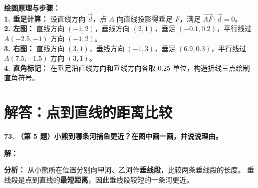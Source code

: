 \documentclass[12pt, a4paper]{ctexrep}
\begin{document}
\vspace{0.4cm}
{\small\color{blue!70!black}
\textbf{绘图原理与步骤：}\\
\textbf{1. 垂足计算：} 设直线方向 $\vec{d}$，点 $A$ 向直线投影得垂足 $F$，满足 $\overrightarrow{AF} \cdot \vec{d} = 0$。\\
\textbf{2. 左图：} 直线方向 $(-1,2)$，垂线方向 $(2,1)$，垂足 $(-0.1, 0.2)$，平行线过 $A(-2.5,-1)$ 方向 $(-1,2)$。\\
\textbf{3. 右图：} 直线方向 $(3,1)$，垂线方向 $(-1,3)$，垂足 $(6.9, 0.3)$，平行线过 $A(7.5,-1.5)$ 方向 $(3,1)$。\\
\textbf{4. 直角标记：} 在垂足沿直线方向和垂线方向各取 $0.25$ 单位，构造折线三点绘制直角符号。
}

\newpage

\section{解答：点到直线的距离比较}

\vspace{0.6cm}

\textbf{\LARGE 73.} \textbf{（第 5 题）小熊到哪条河捕鱼更近？在图中画一画，并说说理由。}

\vspace{0.4cm}
\textbf{解：}

\vspace{0.2cm}
\textbf{分析：} 从小熊所在位置分别向甲河、乙河作\textbf{垂线段}，比较两条垂线段的长度。
垂线段是点到直线的\textbf{最短距离}，因此垂线段较短的一条河更近。
\end{document}
